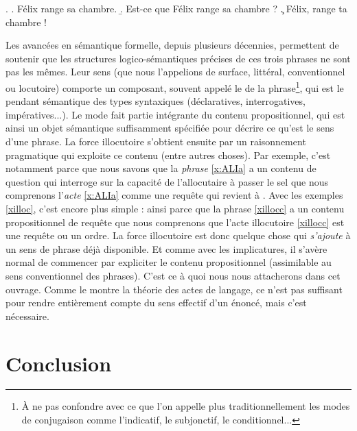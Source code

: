 \begin{refsegment}
\ex. \label{xilloc}
\a. Félix range sa chambre. \label{xilloca}
\b. Est-ce que Félix  range sa chambre ? \label{xillocb}
\c. Félix, range ta chambre ! \label{xillocc}


Les avancées en sémantique formelle, depuis plusieurs décennies, permettent de soutenir que les structures logico-sémantiques précises de ces trois phrases ne sont pas les mêmes.  
Leur sens  (que nous l'appelions de surface, littéral, conventionnel ou locutoire) comporte un composant, souvent appelé le  de la phrase\footnote{À ne pas confondre avec ce que l'on appelle plus traditionnellement les modes de conjugaison comme l'indicatif, le subjonctif, le conditionnel...}, qui est le pendant sémantique des types syntaxiques (déclaratives, interrogatives, impératives...).
Le mode fait partie intégrante du contenu propositionnel, qui est ainsi un objet sémantique suffisamment spécifiée pour décrire ce qu'est le sens d'une phrase.  
La force illocutoire s'obtient ensuite par un raisonnement pragmatique qui exploite ce contenu (entre autres choses).  Par exemple, c'est notamment parce que nous savons que la \emph{phrase} \ref{x:ALIa} a un contenu de question qui interroge sur la capacité de l'allocutaire à passer le sel que nous comprenons l'\emph{acte} \ref{x:ALIa} comme une requête  qui revient à .  
Avec les exemples \ref{xilloc}, c'est encore plus simple : ainsi  parce que la phrase \ref{xillocc} a un contenu propositionnel de requête que nous comprenons que l'acte illocutoire \ref{xillocc} est une requête ou un ordre.  
La force illocutoire est donc  quelque chose qui \emph{s'ajoute} à un sens de phrase déjà disponible. Et comme avec les implicatures, il s'avère normal de commencer par expliciter le contenu propositionnel (assimilable au sens conventionnel des phrases).  C'est ce à quoi nous nous attacherons dans cet ouvrage.  Comme le montre la théorie des actes de langage, ce n'est pas suffisant pour rendre entièrement compte du sens effectif d'un énoncé, mais c'est nécessaire.









\section{Conclusion}


\end{refsegment}
